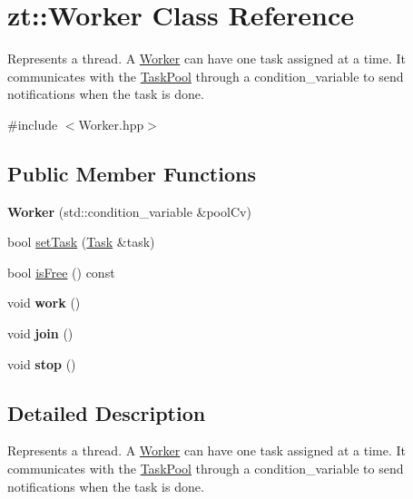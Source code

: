 \hypertarget{classzt_1_1_worker}{}\section{zt\+:\+:Worker Class Reference}
\label{classzt_1_1_worker}


Represents a thread. A \hyperlink{classzt_1_1_worker}{Worker} can have one task assigned at a time. It communicates with the \hyperlink{classzt_1_1_task_pool}{Task\+Pool} through a condition\+\_\+variable to send notifications when the task is done.  




{\ttfamily \#include $<$Worker.\+hpp$>$}

\subsection*{Public Member Functions}
\begin{DoxyCompactItemize}
\item 
\mbox{\label{classzt_1_1_worker_a484c82fb91c80738f88505a2481a0ce6}} 
{\bfseries Worker} (std\+::condition\+\_\+variable \&pool\+Cv)
\item 
bool \hyperlink{classzt_1_1_worker_a4e5938583876d5e05e3f4418ef135634}{set\+Task} (\hyperlink{classzt_1_1_task}{Task} \&task)
\item 
bool \hyperlink{classzt_1_1_worker_a5f1ff7cb0e56f997c164a7e170ac3600}{is\+Free} () const
\item 
\mbox{\label{classzt_1_1_worker_a261f37b96112a235b2966dfc891df6c1}} 
void {\bfseries work} ()
\item 
\mbox{\label{classzt_1_1_worker_a0bd417f2666e50c98ed00981165006c3}} 
void {\bfseries join} ()
\item 
\mbox{\label{classzt_1_1_worker_a003ddc5f1a4de3f2e51cbf01d4a6af34}} 
void {\bfseries stop} ()
\end{DoxyCompactItemize}


\subsection{Detailed Description}
Represents a thread. A \hyperlink{classzt_1_1_worker}{Worker} can have one task assigned at a time. It communicates with the \hyperlink{classzt_1_1_task_pool}{Task\+Pool} through a condition\+\_\+variable to send notifications when the task is done. 

